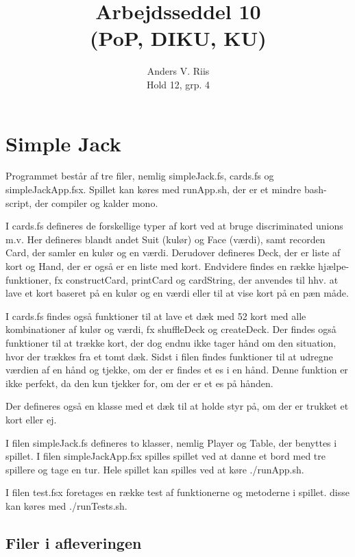 \documentclass{pop}
\author{Anders V. Riis \\ Hold 12, grp. 4}
\title{Arbejdsseddel 10 \\(PoP, DIKU, KU)}
\begin{document}
\maketitle
\section*{Simple Jack}
Programmet består af tre filer, nemlig simpleJack.fs, cards.fs og simpleJackApp.fsx. Spillet kan køres med runApp.sh, der er et mindre bash-script, der compiler og kalder mono.

I cards.fs defineres de forskellige typer af kort ved at bruge discriminated unions m.v. Her defineres blandt andet Suit (kulør) og Face (værdi), samt recorden Card, der samler en kulør og en værdi. Derudover defineres Deck, der er liste af kort og Hand, der er også er en liste med kort. Endvidere findes en række hjælpe-funktioner, fx constructCard, printCard og cardString, der anvendes til hhv. at lave et kort baseret på en kulør og en værdi eller til at vise kort på en pæn måde.

I cards.fs findes også funktioner til at lave et dæk med 52 kort med alle kombinationer af kulør og værdi, fx shuffleDeck og createDeck. Der findes også funktioner til at trække kort, der dog endnu ikke tager hånd om den situation, hvor der trækkes fra et tomt dæk. Sidst i filen findes funktioner til at udregne værdien af en hånd og tjekke, om der er findes et es i en hånd. Denne funktion er ikke perfekt, da den kun tjekker for, om der er et es på hånden.

Der defineres også en klasse med et dæk til at holde styr på, om der er trukket et kort eller ej.

I filen simpleJack.fs defineres to klasser, nemlig Player og Table, der benyttes i spillet. I filen simpleJackApp.fsx spilles spillet ved at danne et bord med tre spillere og tage en tur. Hele spillet kan spilles ved at køre ./runApp.sh.

I filen test.fsx foretages en række test af funktionerne og metoderne i spillet. disse kan køres med ./runTests.sh.

\subsection*{Filer i afleveringen}
\end{document}
